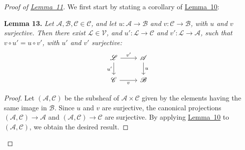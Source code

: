 \documentclass{article}
\newenvironment{itenv}[1]
  {\phantomsection\par\medskip\noindent\textbf{#1.}\itshape}
  {\par\medskip}
\newcommand{\scr}[1]{{\mathscr{#1}}}
\renewcommand{\cal}[1]{{\mathcal{#1}}}
\begin{document}
\begin{proof}[Proof of {\hyperref[lemma11]{Lemma~11}}]
  We first start by stating a corollary of \hyperref[lemma10]{Lemma~10}:
  \begin{itenv}{Lemma 13}
  \label{lemma13}
    Let $\scr{A},\scr{B},\scr{C}\in\cal{C}$, and let $u\colon\scr{A}\to\scr{B}$ and $v\colon\scr{C}\to\scr{B}$, with $u$ and $v$ surjective.
    Then there exist $\scr{L}\in\cal{V}$, and $u'\colon\scr{L}\to\scr{C}$ and $v'\colon\scr{L}\to\scr{A}$, such that $v\circ u'=u\circ v'$, with $u'$ and $v'$ surjective:
    \[
      \begin{tikzcd}
        \scr{L} \ar[r,"v'"] \ar[d,swap,"u'"]
        & \scr{A} \ar[d,"u"]
      \\\scr{C} \ar[r,swap,"v"]
        & \scr{B}
      \end{tikzcd}
    \]
  \end{itenv}

  \begin{proof}
    Let $(\scr{A},\scr{C})$ be the subsheaf of $\scr{A}\times\scr{C}$ given by the elements having the same image in $\scr{B}$.
    Since $u$ and $v$ are surjective, the canonical projections $(\scr{A},\scr{C})\to\scr{A}$ and $(\scr{A},\scr{C})\to\scr{C}$ are surjective.
    By applying \hyperref[lemma10]{Lemma~10} to $(\scr{A},\scr{C})$, we obtain the desired result.
  \end{proof}


\end{proof}
\end{document}
